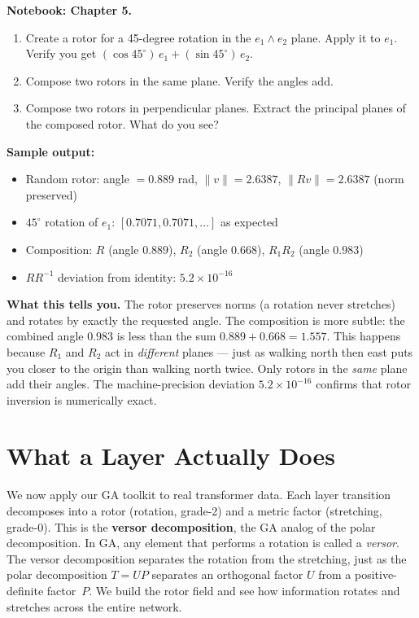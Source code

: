 \documentclass[11pt, twoside, openright]{memoir}
\newcommand{\op}{\wedge}          %
\begin{document}
\begin{tryit}
\textbf{Notebook: Chapter 5.}
\begin{enumerate}[nosep]
\item Create a rotor for a 45-degree rotation in the $e_1 \op e_2$
  plane.  Apply it to $e_1$.  Verify you get
  $(\cos 45^\circ)\,e_1 + (\sin 45^\circ)\,e_2$.
\item Compose two rotors in the same plane.  Verify the angles add.
\item Compose two rotors in perpendicular planes.  Extract the
  principal planes of the composed rotor.  What do you see?
\end{enumerate}

\medskip
\textbf{Sample output:}
\begin{itemize}[nosep]
\item Random rotor: angle $= 0.889$ rad, $\|v\| = 2.6387$, $\|Rv\| = 2.6387$ (norm preserved)
\item $45^\circ$ rotation of $e_1$: $[0.7071, 0.7071, \ldots]$ as expected
\item Composition: $R$ (angle $0.889$), $R_2$ (angle $0.668$), $R_1 R_2$ (angle $0.983$)
\item $R R^{-1}$ deviation from identity: $5.2 \times 10^{-16}$
\end{itemize}

\medskip
\textbf{What this tells you.}
The rotor preserves norms (a rotation never stretches) and rotates by exactly the requested angle. The composition is more subtle: the combined angle $0.983$ is less than the sum $0.889 + 0.668 = 1.557$. This happens because $R_1$ and $R_2$ act in \emph{different} planes --- just as walking north then east puts you closer to the origin than walking north twice. Only rotors in the \emph{same} plane add their angles. The machine-precision deviation $5.2 \times 10^{-16}$ confirms that rotor inversion is numerically exact.
\end{tryit}


\chapter{What a Layer Actually Does}
\label{chap:versor}

\begin{whycare}
We now apply our GA toolkit to real transformer data.  Each layer
transition decomposes into a rotor (rotation, grade-2) and a metric
factor (stretching, grade-0).  This is the \textbf{versor decomposition},
the GA analog of the polar decomposition.  In GA, any element that
performs a rotation is called a \emph{versor}.  The versor decomposition
separates the rotation from the stretching, just as the polar
decomposition $T = UP$ separates an orthogonal factor $U$ from a
positive-definite factor~$P$.  We build the rotor field and
see how information rotates and stretches across the entire network.
\end{whycare}
\end{document}
